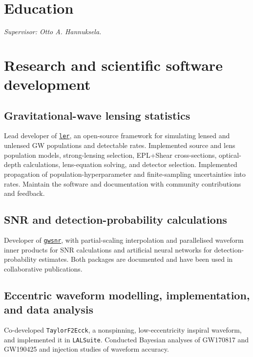 \documentclass[11pt]{article}
\begin{document}

\section*{Education}
\textit{Supervisor: Otto A. Hannuksela.}

\section*{Research and scientific software development}
\subsection*{Gravitational-wave lensing statistics}
Lead developer of \href{https://ler.hemantaph.com/}{\texttt{ler}}, an open-source framework for simulating lensed and unlensed GW populations and detectable rates. Implemented source and lens population models, strong-lensing selection, EPL+Shear cross-sections, optical-depth calculations, lens-equation solving, and detector selection. Implemented propagation of population-hyperparameter and finite-sampling uncertainties into rates. Maintain the software and documentation with community contributions and feedback.

\subsection*{SNR and detection-probability calculations}
Developer of \href{https://gwsnr.hemantaph.com/}{\texttt{gwsnr}}, with partial-scaling interpolation and parallelised waveform inner products for SNR calculations and artificial neural networks for detection-probability estimates. Both packages are documented and have been used in collaborative publications.

\subsection*{Eccentric waveform modelling, implementation, and data analysis}
Co-developed \texttt{TaylorF2Ecck}, a nonspinning, low-eccentricity inspiral waveform, and implemented it in \texttt{LALSuite}. Conducted Bayesian analyses of GW170817 and GW190425 and injection studies of waveform accuracy.
\end{document}
